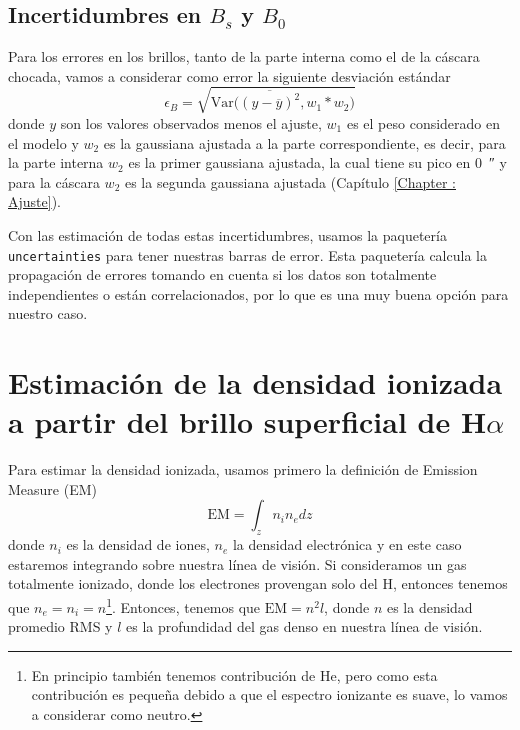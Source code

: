 \documentclass{book}
\begin{document}
\subsection{\boldmath Incertidumbres en $B_s$ y $B_0$}

Para los errores en los brillos, tanto de la parte interna como el de la cáscara chocada, vamos a considerar como error la siguiente desviación estándar
\begin{equation} \epsilon_{B}=\sqrt{\mathrm{Var}\Big(\overline{(y-\overline{y})^2},w_1*w_2\Big)} 
\end{equation} 
donde $y$ son los valores observados menos el ajuste, $w_1$ es el peso considerado en el modelo  y $w_2$ es la gaussiana ajustada a la parte correspondiente, es decir, para la parte interna $w_2$ es la primer gaussiana ajustada, la cual tiene su pico en \SI{0}{\arcsecond} y para la cáscara $w_2$ es la segunda gaussiana ajustada (Capítulo \ref{Chapter : Ajuste}). 

Con las estimación de todas estas incertidumbres, usamos la paquetería \verb|uncertainties| para tener nuestras barras de error. Esta paquetería calcula la propagación de errores tomando en cuenta si los datos son totalmente independientes o están correlacionados, por lo que es una muy buena opción para nuestro caso.

\section{\boldmath Estimación de la densidad ionizada a partir del brillo superficial de H$\alpha$}\label{Sec : estimacion de densidad}

Para estimar la densidad ionizada, usamos primero la definición de Emission Measure (EM)
\begin{equation}
\mathrm{EM}=\int_z n_i n_edz    
\end{equation}
donde $n_i$ es la densidad de iones, $n_e$ la densidad electrónica y en este caso estaremos integrando sobre nuestra línea de visión. Si consideramos un gas totalmente ionizado, donde los electrones provengan solo del H, entonces tenemos que $n_e=n_i=n$\footnote{En principio también tenemos contribución de He, pero como esta contribución es pequeña debido a que el espectro ionizante es suave, lo vamos a considerar como neutro.}. Entonces, tenemos que $\mathrm{EM}=n^2l$, donde $n$ es la densidad promedio RMS y $l$ es la profundidad del gas denso en nuestra línea de visión.
 
\end{document}
